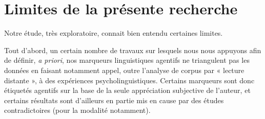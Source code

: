 \section{Limites de la présente recherche}

Notre étude, très exploratoire, connait bien entendu certaines limites. 

Tout d’abord, un certain nombre de travaux sur lesquels nous nous appuyons afin de définir, \textit{a priori}, nos marqueurs linguistiques agentifs ne triangulent pas les données en faisant notamment appel, outre l'analyse de corpus par  « lecture distante », à des expériences psycholinguistiques. Certains marqueurs sont donc étiquetés agentifs sur la base de la seule appréciation subjective de l’auteur, et certains résultats sont d’ailleurs en partie mis en cause par des études contradictoires (pour la modalité notamment). 

